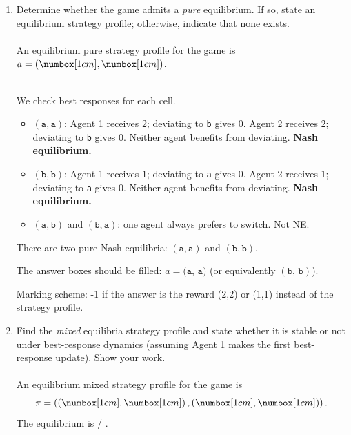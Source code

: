 \begin{enumerate}
\item \points[2] Determine whether the game admits a \textit{pure} equilibrium. If so, state an equilibrium strategy profile; otherwise, indicate that none exists.
\\~\\
An equilibrium pure strategy profile for the game is $a = \left(\numbox[1cm], \numbox[1cm]\right)$.
\\~\\

\begin{solution}
We check best responses for each cell.
\begin{itemize}
  \item $(\texttt{a},\texttt{a})$: Agent 1 receives $2$; deviating to \texttt{b} gives $0$. Agent 2 receives $2$; deviating to \texttt{b} gives $0$. Neither agent benefits from deviating. \textbf{Nash equilibrium.}
  \item $(\texttt{b},\texttt{b})$: Agent 1 receives $1$; deviating to \texttt{a} gives $0$. Agent 2 receives $1$; deviating to \texttt{a} gives $0$. Neither agent benefits from deviating. \textbf{Nash equilibrium.}
  \item $(\texttt{a},\texttt{b})$ and $(\texttt{b},\texttt{a})$: one agent always prefers to switch. Not NE.
\end{itemize}
There are two pure Nash equilibria: $(\texttt{a},\texttt{a})$ and $(\texttt{b},\texttt{b})$.

\medskip
\noindent The answer boxes should be filled: $a = \bigl(\texttt{a},\,\texttt{a}\bigr)$ (or equivalently $(\texttt{b},\,\texttt{b})$).

Marking scheme: -1 if the answer is the reward (2,2) or (1,1) instead of the strategy profile.
\end{solution}

\clearpage
\item \points[4] Find the \textit{mixed} equilibria strategy profile and state whether it is stable or not under best-response dynamics (assuming Agent 1 makes the first best-response update). Show your work.
\\~\\
An equilibrium mixed strategy profile for the game is
\[\pi = \left(\left(\numbox[1cm],\numbox[1cm]\right), \left(\numbox[1cm],\numbox[1cm]\right)\right).\]
The equilibrium is \raisebox{1.75mm}{\choice[stable]} / \raisebox{1.75mm}{\choice[unstable]}.
\vspace{3cm}


\end{enumerate}

